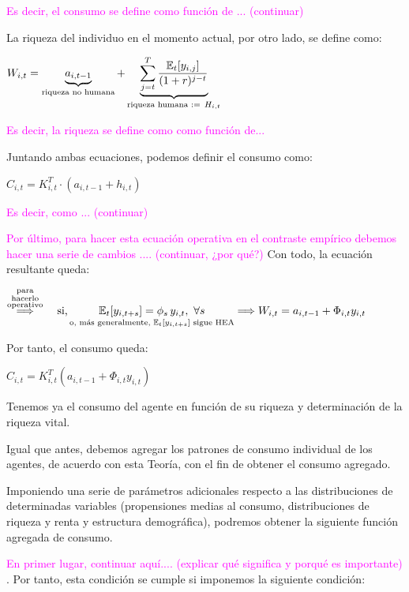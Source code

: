 \documentclass[10pt,a4paper]{article}
\begin{document}
\textcolor{magenta}{Es decir, el consumo se define como función de ... (continuar)}

La riqueza del individuo en el momento actual, por otro lado, se define como:

$\begin{aligned}
  W_{i,t}=\underbrace{a_{i,t-1}}_{\text{\scriptsize riqueza no humana}}+\underbrace{\sum_{j=t}^T\frac{\mathbb E_t[y_{i,{j}}]}{(1+r)^{j-t}}}_{\text{\scriptsize riqueza humana $:=\,H_{i,t}$}}
\end{aligned}$

\textcolor{magenta}{Es decir, la riqueza se define como como función de...}

Juntando ambas ecuaciones, podemos definir el consumo como:

$C_{i,t}=K_{i,t}^T\cdot(a_{i,t-1}+h_{i,t})$

\textcolor{magenta}{Es decir, como ... (continuar)}

\textcolor{magenta}{Por último, para hacer esta ecuación operativa en el contraste empírico debemos hacer una serie de cambios .... (continuar, ¿por qué?)} Con todo, la ecuación resultante queda:

$\begin{aligned}
  \overset{\substack{\text{\scriptsize para}\\\text{\scriptsize hacerlo}\\\text{\scriptsize operativo}}}{\Longrightarrow}\quad 
    \text{si,}\,\underset{\text{\scriptsize o, más generalmente, $\mathbb E_t[y_{i,t+s}]$ sigue HEA}}{\mathbb E_t[y_{i,t+s}] = \phi_s\,y_{i,t},\,\,\forall s}\Longrightarrow W_{i,t}=a_{i,t-1}+\Phi_{i,t}y_{i,t}
\end{aligned}$

Por tanto, el consumo queda:

$C_{i,t}=K_{i,t}^T(a_{i,t-1}+\Phi_{i,t}y_{i,t})$

Tenemos ya el consumo del agente en función de su riqueza y determinación de la riqueza vital.


Igual que antes, debemos agregar los patrones de consumo individual de los agentes, de acuerdo con esta Teoría, con el fin de obtener el consumo agregado. 

Imponiendo una serie de parámetros adicionales respecto a las distribuciones de determinadas variables (propensiones medias al consumo, distribuciones de riqueza y renta y estructura demográfica), podremos obtener la siguiente función agregada de consumo.

\textcolor{magenta}{En primer lugar, continuar aquí.... (explicar qué significa y porqué es importante)} . Por tanto, esta condición se cumple si imponemos la siguiente condición:
\end{document}
